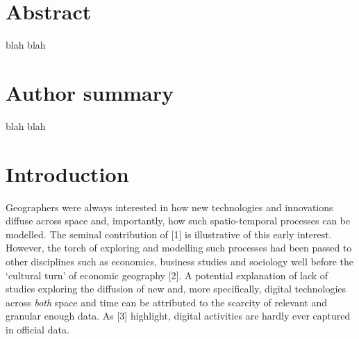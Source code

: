 \documentclass[10pt,letterpaper]{article}
\newcommand{\getIndex}[2]{
  \ForEach{,}{\IfEq{#1}{\thislevelitem}{\number\thislevelcount\ExitForEach}{}}{#2}
}
\newcommand{\getAff}[1]{
  \getIndex{#1}{University of Bristol and The Alan Turing Institute}
}
\begin{document}
\vspace*{0.2in}


\section*{Abstract}
blah blah

\section*{Author summary}
blah blah

\linenumbers

\hypertarget{sec:1}{%
\section{Introduction}\label{sec:1}}

Geographers were always interested in how new technologies and
innovations diffuse across space and, importantly, how such
spatio-temporal processes can be modelled. The seminal contribution of
{[}1{]} is illustrative of this early interest. However, the torch of
exploring and modelling such processes had been passed to other
disciplines such as economics, business studies and sociology well
before the `cultural turn' of economic geography {[}2{]}. A potential
explanation of lack of studies exploring the diffusion of new and, more
specifically, digital technologies across \emph{both} space and time can
be attributed to the scarcity of relevant and granular enough data. As
{[}3{]} highlight, digital activities are hardly ever captured in
official data.
\end{document}
